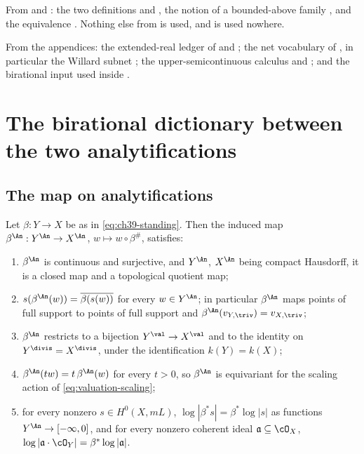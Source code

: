 From  and
: the two definitions
 and , the
notion of a bounded-above family , and the
equivalence .  Nothing else from
 is used, and 
is used nowhere.

From the appendices: the extended-real ledger of
 and ; the net
vocabulary of , in particular the Willard subnet
; the upper-semicontinuous calculus
 and ; and the
birational input  used inside
.

\section{The birational dictionary between the two analytifications}
\label{sec:ch39-analytifications}

\subsection{The map on analytifications}
\label{sec:ch39-beta-an}

\begin{lemma}
\label{lem:ch39-beta-an}
Let $\beta:Y\to X$ be as in \eqref{eq:ch39-standing}.  Then the induced
map $\beta^{\An}:Y^{\An}\to X^{\An}$, $w\mapsto w\circ\beta^{\#}$,
satisfies:
\begin{enumerate}
\item\label{itm:ch39-ban:cont} $\beta^{\An}$ is continuous and
 surjective, and $Y^{\An}$, $X^{\An}$ being compact Hausdorff, it is a
 closed map and a topological quotient map;
\item\label{itm:ch39-ban:supp} $s(\beta^{\An}(w))=\overline{\beta(s(w))}$
 for every $w\in Y^{\An}$; in particular $\beta^{\An}$ maps points of
 full support to points of full support and $\beta^{\An}(v_{Y,\triv})
 =v_{X,\triv}$;
\item\label{itm:ch39-ban:val} $\beta^{\An}$ restricts to a bijection
 $Y^{\val}\to X^{\val}$ and to the identity on
 $Y^{\divis}=X^{\divis}$, under the identification $k(Y)=k(X)$;
\item\label{itm:ch39-ban:scaling} $\beta^{\An}(tw)=t\,\beta^{\An}(w)$ for
 every $t>0$, so $\beta^{\An}$ is equivariant for the scaling action of
 \eqref{eq:valuation-scaling};
\item\label{itm:ch39-ban:sections} for every nonzero
 $s\in H^0(X,mL)$, $\log|\beta^*s|=\beta^*\log|s|$ as functions
 $Y^{\An}\to[-\infty,0]$, and for every nonzero coherent ideal
 $\mathfrak a\subseteq\cO_X$,
 $\log|\mathfrak a\cdot\cO_Y|=\beta^*\log|\mathfrak a|$.
\end{enumerate}
\end{lemma}

